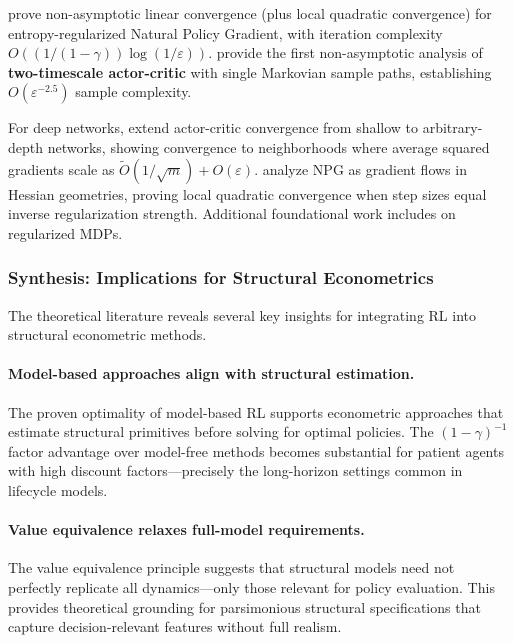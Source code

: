 \citet{cen2022fast} prove non-asymptotic linear convergence (plus local quadratic convergence) for entropy-regularized Natural Policy Gradient, with iteration complexity $O((1/(1-\gamma))\log(1/\varepsilon))$. \citet{wu2020twotimescale} provide the first non-asymptotic analysis of \textbf{two-timescale actor-critic} with single Markovian sample paths, establishing $O(\varepsilon^{-2.5})$ sample complexity.

For deep networks, \citet{li2023actorcritic} extend actor-critic convergence from shallow to arbitrary-depth networks, showing convergence to neighborhoods where average squared gradients scale as $\tilde{O}(1/\sqrt{m}) + O(\varepsilon)$. \citet{muller2024npg} analyze NPG as gradient flows in Hessian geometries, proving local quadratic convergence when step sizes equal inverse regularization strength. Additional foundational work includes \citet{geist2019regularized} on regularized MDPs.

\subsubsection{Synthesis: Implications for Structural Econometrics}

The theoretical literature reveals several key insights for integrating RL into structural econometric methods.

\paragraph{Model-based approaches align with structural estimation.} The proven optimality of model-based RL \citep{zhang2024settling,li2024breaking} supports econometric approaches that estimate structural primitives before solving for optimal policies. The $(1-\gamma)^{-1}$ factor advantage over model-free methods becomes substantial for patient agents with high discount factors---precisely the long-horizon settings common in lifecycle models.

\paragraph{Value equivalence relaxes full-model requirements.} The value equivalence principle \citep{grimm2020value} suggests that structural models need not perfectly replicate all dynamics---only those relevant for policy evaluation. This provides theoretical grounding for parsimonious structural specifications that capture decision-relevant features without full realism.


